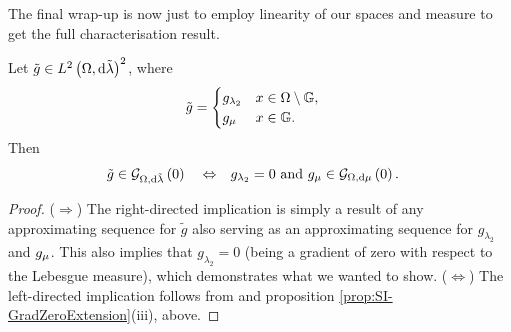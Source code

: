 The final wrap-up is now just to employ linearity of our spaces and measure to get the full characterisation result.
\begin{theorem} \label{thm:SI-GradZeroChar}
	Let $\tilde{g}\in L^{2}\left( \Omega,\mathrm{d}\tilde{\lambda} \right)^2$, where
	\begin{align*}
		\tilde{g} &= \begin{cases} g_{\lambda_2} & x\in\Omega\setminus\mathbb{G}, \\ g_{\mu} & x\in\mathbb{G}. \end{cases}
	\end{align*}
	Then
	\begin{align*}
		\tilde{g}\in\mathcal{G}_{ \Omega, \mathrm{d}\tilde{\lambda}}\left( 0 \right)
		\quad\Leftrightarrow\quad &
		g_{\lambda_2} = 0 \text{ and } g_{\mu}\in\mathcal{G}_{ \Omega, \mathrm{d}\mu}\left( 0 \right).
	\end{align*}
\end{theorem}
\begin{proof}
	($\Rightarrow$) The right-directed implication is simply a result of any approximating sequence for $\tilde{g}$ also serving as an approximating sequence for $g_{\lambda_2}$ and $g_{\mu}$.
	This also implies that $g_{\lambda_2} = 0$ (being a gradient of zero with respect to the Lebesgue measure), which demonstrates what we wanted to show. \newline
	($\Leftrightarrow$) The left-directed implication follows from  and proposition \ref{prop:SI-GradZeroExtension}(iii), above.
\end{proof}